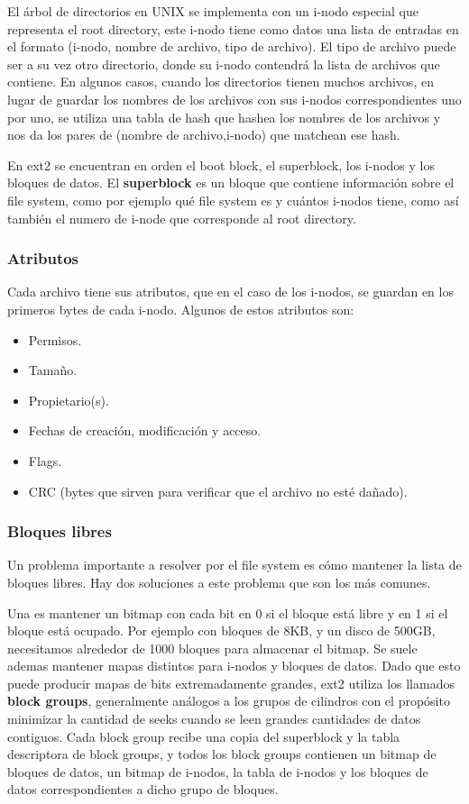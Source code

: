 \documentclass{article}
\begin{document}
El \'arbol de directorios en UNIX se implementa con un i-nodo especial que representa el root directory, este i-nodo tiene como datos una lista de entradas en el formato (i-nodo, nombre de archivo, tipo de archivo). El tipo de archivo puede ser a su vez otro directorio, donde su i-nodo contendrá la lista de archivos que contiene. En algunos casos, cuando los directorios tienen muchos archivos, en lugar de guardar los nombres de los archivos con sus i-nodos correspondientes uno por uno, se utiliza una tabla de hash que hashea los nombres de los archivos y nos da los pares de (nombre de archivo,i-nodo) que matchean ese hash.

En ext2 se encuentran en orden el boot block, el superblock, los i-nodos y los bloques de datos. El \textbf{superblock} es un bloque que contiene informaci\'on sobre el file system, como por ejemplo qu\'e file system es y cu\'antos i-nodos tiene, como así también el numero de i-node que corresponde al root directory.

\subsubsection{Atributos}

Cada archivo tiene sus atributos, que en el caso de los i-nodos, se guardan en los primeros bytes de cada i-nodo. Algunos de estos atributos son:

\begin{itemize}
\item Permisos.
\item Tama\~no.
\item Propietario(s).
\item Fechas de creaci\'on, modificaci\'on y acceso.
\item Flags.
\item CRC (bytes que sirven para verificar que el archivo no est\'e da\~nado).
\end{itemize}

\subsubsection{Bloques libres}

Un problema importante a resolver por el file system es c\'omo mantener la lista de bloques libres. Hay dos soluciones a este problema que son los m\'as comunes. 

Una es mantener un bitmap con cada bit en 0 si el bloque est\'a libre y en 1 si el bloque est\'a ocupado. Por ejemplo con bloques de 8KB, y un disco de 500GB, necesitamos alrededor de 1000 bloques para almacenar el bitmap. Se suele ademas mantener mapas distintos para i-nodos y bloques de datos. Dado que esto puede producir mapas de bits extremadamente grandes, ext2 utiliza los llamados \textbf{block groups}, generalmente análogos a los grupos de cilindros con el propósito minimizar la cantidad de seeks cuando se leen grandes cantidades de datos contiguos. Cada block group recibe una copia del superblock y la tabla descriptora de block groups, y todos los block groups contienen un bitmap de bloques de datos, un bitmap de i-nodos, la tabla de i-nodos y los bloques de datos correspondientes a dicho grupo de bloques.
\end{document}
